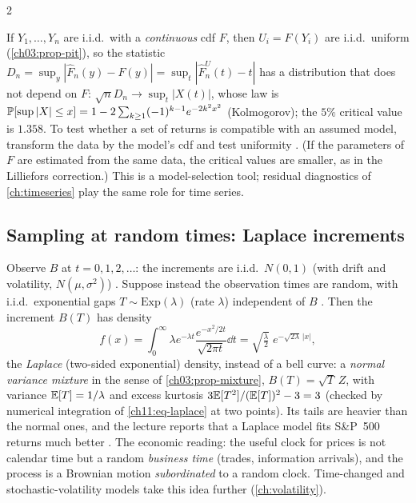 \begin{paracol}{2}
\begin{finance}
If $Y_1,\dots,Y_n$ are i.i.d.\ with a \emph{continuous} cdf $F$, then $U_i=F(Y_i)$ are i.i.d.\ uniform (\cref{ch03:prop-pit}), so
the statistic $D_n=\sup_y|\hat F_n(y)-F(y)|=\sup_t|\hat F_n^U(t)-t|$ has a distribution that does not depend on $F$: $\sqrt nD_n\to\sup_{t}|X(t)|$, whose law is
$\mathbb{P}[\sup|X|\le x]=1-2\sum_{k\ge1}(-1)^{k-1}e^{-2k^2x^2}$ (Kolmogorov); the $5\%$ critical value is $1.358$.
To test whether a set of returns is compatible with an assumed model, transform the data by the model's cdf and test uniformity
. (If the parameters of $F$ are estimated from the same data, the critical values are smaller, as in the Lilliefors
correction.) This is a model-selection tool; residual diagnostics of \cref{ch:timeseries} play the same role for time series.
\end{finance}

\subsection{Sampling at random times: Laplace increments}\label{ch11:sec-laplace}
Observe $B$ at $t=0,1,2,\dots$: the increments are i.i.d.\ $N(0,1)$ (with drift and volatility, $N(\mu,\sigma^2)$)
. Suppose instead the observation times are random, with i.i.d.\ exponential gaps $T\sim\mathrm{Exp}(\lambda)$ (rate $\lambda$)
independent of $B$ . Then the increment $B(T)$ has density
\begin{equation}\label{ch11:eq-laplace}
  f(x)=\int_0^\infty\lambda e^{-\lambda t}\frac{e^{-x^2/2t}}{\sqrt{2\pi t}}\dd t=\sqrt{\tfrac\lambda2}\;e^{-\sqrt{2\lambda}\,|x|},
\end{equation}
the \emph{Laplace} (two-sided exponential) density, instead of a bell curve: a \emph{normal variance mixture} in
the sense of \cref{ch03:prop-mixture}, $B(T)=\sqrt T\,Z$, with variance $\mathbb{E}[T]=1/\lambda$ and excess kurtosis $3\mathbb{E}[T^2]/(\mathbb{E}[T])^2-3=3$ (checked by numerical integration of \eqref{ch11:eq-laplace} at two points). Its tails are heavier than the normal ones, and the
lecture reports that a Laplace model fits S\&P~500 returns much better . The economic reading: the useful clock for prices
is not calendar time but a random \emph{business time} (trades, information arrivals), and the process is a Brownian motion \emph{subordinated} to a
random clock. Time-changed and stochastic-volatility models take this idea further (\cref{ch:volatility}).


\end{paracol}
